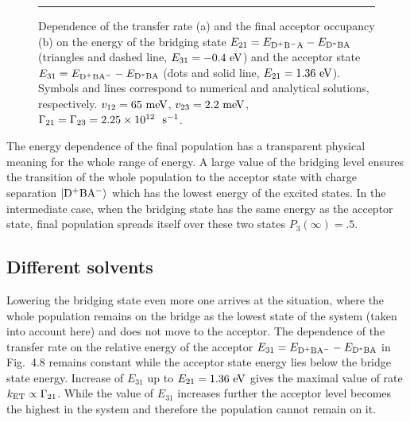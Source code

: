 \documentclass[12pt,twoside,a4paper]{report}
\begin{document}
\footnotesize\begin{figure}[!h]\centering
  \parbox{6cm}
  {\rule{-3cm}{4cm}
\epsfxsize=8.5cm}
\caption[Dependence of the transfer rate on the energy 
of the bridging state ]
{\small 
\label{chem-energy}
Dependence of the transfer rate 
(a)  and the final acceptor occupancy (b) 
on the energy 
of the bridging state 
$E_{21}=E_{\rm D^+B^-A}-E_{\rm D^*BA}$
(triangles and dashed line, 
$E_{31}=-0.4~{\rm eV}$)
and the acceptor state
$E_{31}=E_{\rm D^+BA^-}-E_{\rm D^*BA}$
(dots and solid line,
$E_{21}=1.36~{\rm eV}$).
Symbols and lines correspond to numerical and analytical solutions, respectively.
$v_{12}=65~{\rm meV}$, $v_{23}=2.2~{\rm meV}$,
$\Gamma_{21}=\Gamma_{23}=2.25 \times 10^{12}~ ~{\rm s}^{-1}$.
}
\end{figure}\normalsize

The energy dependence of the final population 
has a transparent physical meaning for the whole 
range of energy. 
A large value of the bridging level ensures 
the transition of the whole population to the  
acceptor state with charge separation ${\rm \left|D^+BA^-   \right> }$ 
which has the lowest energy of the excited states.
In the intermediate case, when the bridging state has the same energy  
as the acceptor state, final 
population spreads itself over  
these two states $P_3(\infty)=.5$. 
\subsection{Different solvents\label{chem-solvents}}
Lowering the bridging state even more 
one arrives at
the situation, where the   
whole population remains on the bridge as the lowest 
state of the system (taken into account here)
and does not move to the acceptor.
The dependence of the transfer rate
on the relative energy of the acceptor
$E_{31}=E_{\rm D^+BA^-}-E_{\rm D^*BA}$ in Fig.~4.8
remains constant while the acceptor state energy lies below the 
bridge state energy.
Increase of $E_{31}$ up to $E_{21}=1.36~ {\rm eV}$ 
gives the maximal value of rate $k_{\rm ET}\propto\Gamma_{21}$.
While the value of $E_{31}$ increases further 
 the acceptor level becomes the highest 
in the system and therefore the population cannot remain on it.
\end{document}
